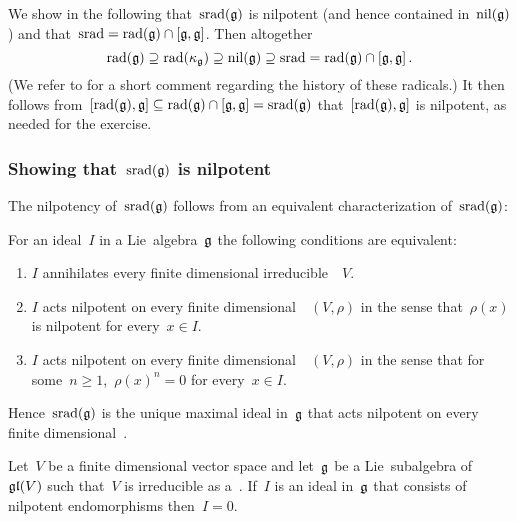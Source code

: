 We show in the following that~$\operatorname{srad}(\mathfrak{g})$ is nilpotent (and hence contained in~$\operatorname{nil}(\mathfrak{g})$) and that~$\operatorname{srad} = \operatorname{rad}(\mathfrak{g}) \cap [\mathfrak{g}, \mathfrak{g}]$.
Then altogether
\[
  \operatorname{rad}(\mathfrak{g})
  \supseteq
  \operatorname{rad}(\kappa_{\mathfrak{g}})
  \supseteq
  \operatorname{nil}(\mathfrak{g})
  \supseteq
  \operatorname{srad}
  =
  \operatorname{rad}(\mathfrak{g}) \cap [\mathfrak{g}, \mathfrak{g}] \,.
\]
(We refer to \cite{radical_history} for a short comment regarding the history of these radicals.)
It then follows from~$[\operatorname{rad}(\mathfrak{g}), \mathfrak{g}] \subseteq \operatorname{rad}(\mathfrak{g}) \cap [\mathfrak{g}, \mathfrak{g}] = \operatorname{srad}(\mathfrak{g})$ that~$[\operatorname{rad}(\mathfrak{g}), \mathfrak{g}]$ is nilpotent, as needed for the exercise.






\subsubsection*{Showing that~$\operatorname{srad}(\mathfrak{g})$ is nilpotent}

The nilpotency of~$\operatorname{srad}(\mathfrak{g})$ follows from an equivalent characterization of~$\operatorname{srad}(\mathfrak{g})$:

\begin{proposition}
  \label{characterization of nilpotent radical}
  For an ideal~$I$ in a Lie~algebra~$\glie$ the following conditions are equivalent:
  \begin{enumerate}
    \item
      \label{annihilates}
      $I$ annihilates every finite dimensional irreducible~{\representation{$\glie$}}~$V$.
    \item
      \label{pointwise nilpotent}
      $I$ acts nilpotent on every finite dimensional~{\representation{$\glie$}}~$(V,\rho)$ in the sense that~$\rho(x)$ is nilpotent for every~$x \in I$.
    \item
      \label{nilpotent}
      $I$ acts nilpotent on every finite dimensional~{\representation{$\glie$}}~$(V,\rho)$ in the sense that for some~$n \geq 1$,~$\rho(x)^n = 0$ for every~$x \in I$.
  \end{enumerate}
  Hence~$\operatorname{srad}(\mathfrak{g})$ is the unique maximal ideal in~$\glie$ that acts nilpotent on every finite dimensional~{\representation{$\glie$}}.
\end{proposition}

\begin{lemma}
  \label{nilpotent on irrep is zero}
  Let~$V$ be a finite dimensional vector space and let~$\glie$ be a Lie~subalgebra of~$\mathfrak{gl}(V)$ such that~$V$ is irreducible as a~{\representation{$\glie$}}.
  If~$I$ is an ideal in~$\glie$ that consists of nilpotent endomorphisms then~$I = 0$.
\end{lemma}

